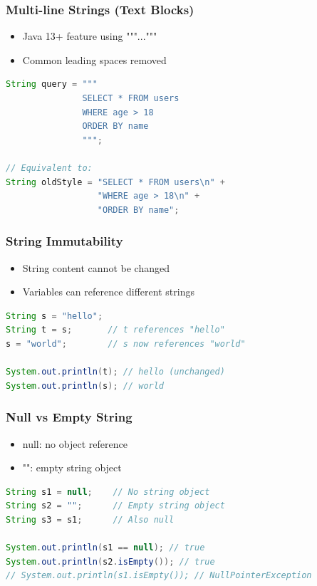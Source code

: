 \documentclass[serif, aspectratio=169]{beamer}
\begin{document}
\begin{frame}[fragile]
\frametitle{Multi-line Strings (Text Blocks)}
\begin{itemize}
    \item Java 13+ feature using """..."""
    \item Common leading spaces removed
\end{itemize}
\begin{lstlisting}[language=Java]
String query = """
               SELECT * FROM users
               WHERE age > 18
               ORDER BY name
               """;

// Equivalent to:
String oldStyle = "SELECT * FROM users\n" +
                  "WHERE age > 18\n" +
                  "ORDER BY name";
\end{lstlisting}
\end{frame}

\begin{frame}[fragile]
\frametitle{String Immutability}
\begin{itemize}
    \item String content cannot be changed
    \item Variables can reference different strings
\end{itemize}
\begin{lstlisting}[language=Java]
String s = "hello";
String t = s;       // t references "hello"
s = "world";        // s now references "world"

System.out.println(t); // hello (unchanged)
System.out.println(s); // world
\end{lstlisting}
\end{frame}

\begin{frame}[fragile]
\frametitle{Null vs Empty String}
\begin{itemize}
    \item null: no object reference
    \item "": empty string object
\end{itemize}
\begin{lstlisting}[language=Java]
String s1 = null;    // No string object
String s2 = "";      // Empty string object
String s3 = s1;      // Also null

System.out.println(s1 == null); // true
System.out.println(s2.isEmpty()); // true
// System.out.println(s1.isEmpty()); // NullPointerException
\end{lstlisting}
\end{frame}
\end{document}
